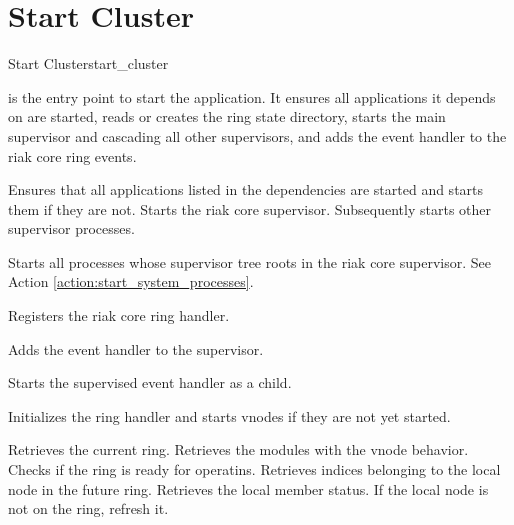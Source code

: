 \section{Start Cluster}
\begin{actionbox}{Start Cluster}{start_cluster}
	\begin{action}
		 is the entry point to start the application.
		It ensures all applications it depends on are started, reads or creates the ring state directory, starts the main supervisor and cascading all other supervisors, and adds the event handler to the riak core ring events.
		\begin{action}
			 Ensures that all applications listed in the dependencies are started and starts them if they are not.
			 Starts the riak core supervisor.
			Subsequently starts other supervisor processes.
			\begin{action}
				 Starts all processes whose supervisor tree roots in the riak core supervisor.
				See Action \ref{action:start_system_processes}.
			\end{action}
			 Registers the riak core ring handler.
			\begin{action}
				 Adds the event handler to the supervisor.
				\begin{action}
					 Starts the supervised event handler as a child.
					\begin{action}
						  Initializes the ring handler and starts vnodes if they are not yet started.
						\begin{action}
							 Retrieves the current ring.
							 Retrieves the modules with the vnode behavior.
							 Checks if the ring is ready for operatins.
							 Retrieves indices belonging to the local node in the future ring.
							 Retrieves the local member status.
							 If the local node is not on the ring, refresh it.
						\end{action}
					\end{action}
				\end{action}
			\end{action}
		\end{action}
	\end{action}
\end{actionbox}

